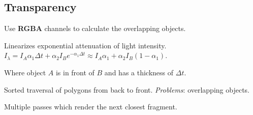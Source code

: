 \subsection{Transparency}

Use \textbf{RGBA} channels to calculate the overlapping objects.

\begin{algorithm}
  Linearizes exponential attenuation of light intensity.
  \(I_\lambda = I_A \alpha_1 \Delta t + \alpha_2 I_Be^{-\alpha_1\Delta t} \approx I_A \alpha_1 + \alpha_2 I_B(1 - \alpha_1)\).

  Where object \(A\) is in front of \(B\) and has a thickness of \(\Delta t\).
\end{algorithm}

\begin{definition}
  Sorted traversal of polygons from back to front.
  \textit{Problems}: overlapping objects.
\end{definition}

\begin{definition}
  Multiple passes which render the next closest fragment.
\end{definition}
